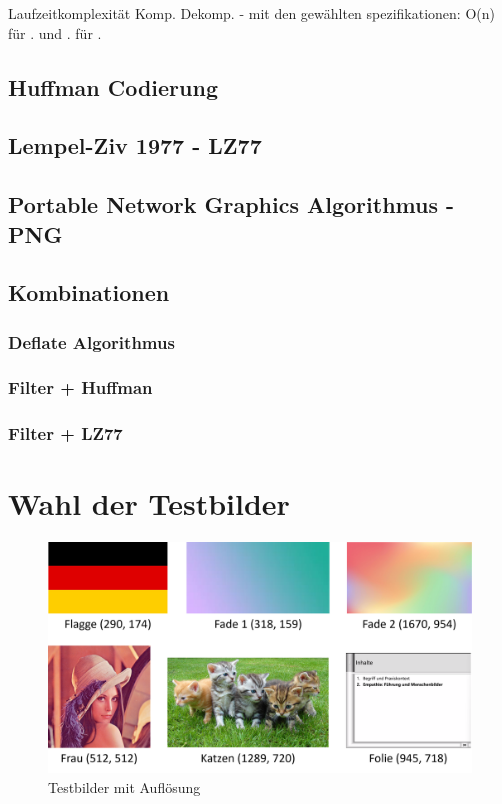 \documentclass[conference]{IEEEtran}
\begin{document}
Laufzeitkomplexität Komp. Dekomp.
- mit den gewählten spezifikationen: O(n) für . und . für .

\subsection{Huffman Codierung}
\subsection{Lempel-Ziv 1977 - LZ77}
\subsection{Portable Network Graphics Algorithmus - PNG}


\subsection{Kombinationen}
\subsubsection{Deflate Algorithmus}
\subsubsection{Filter + Huffman}
\subsubsection{Filter + LZ77}


\section{Wahl der Testbilder}

\begin{figure}[h]
  \centering
  \includegraphics[width=\columnwidth]{./images/Images.png}
  \caption{Testbilder mit Auflösung}
  \label{fig:testbilder}
\end{figure}
\end{document}

